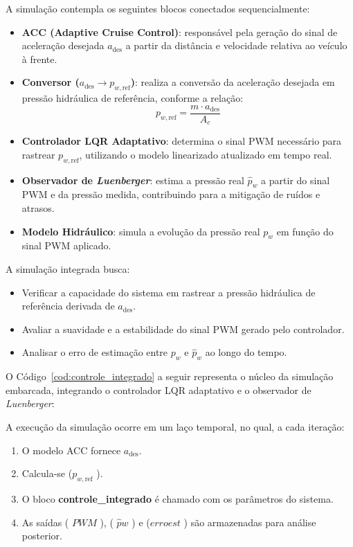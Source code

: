 A simulação contempla os seguintes blocos conectados sequencialmente:

\begin{itemize} 
    \item \textbf{ACC (Adaptive Cruise Control)}: responsável pela geração do sinal de aceleração desejada \(a_{\text{des}}\) a partir da distância e velocidade relativa ao veículo à frente. 
    \item \textbf{Conversor (\(a_{\text{des}} \rightarrow p_{w,\text{ref}}\))}: realiza a conversão da aceleração desejada em pressão hidráulica de referência, conforme a relação: 
          \[ p_{w,\text{ref}} = \frac{m \cdot a_{\text{des}}}{A_c} \] 
    \item \textbf{Controlador LQR Adaptativo}: determina o sinal PWM necessário para rastrear \(p_{w,\text{ref}}\), utilizando o modelo linearizado atualizado em tempo real. 
    \item \textbf{Observador de \textit{Luenberger}}: estima a pressão real \(\hat{p}_w\) a partir do sinal PWM e da pressão medida, contribuindo para a mitigação de ruídos e atrasos. 
    \item \textbf{Modelo Hidráulico}: simula a evolução da pressão real \(p_w\) em função do sinal PWM aplicado. 
\end{itemize}

A simulação integrada busca:

\begin{itemize} 
    \item Verificar a capacidade do sistema em rastrear a pressão hidráulica de referência derivada de \(a_{\text{des}}\). 
    \item Avaliar a suavidade e a estabilidade do sinal PWM gerado pelo controlador. 
    \item Analisar o erro de estimação entre \(p_w\) e \(\hat{p}_w\) ao longo do tempo. 
\end{itemize}

O Código~\ref{cod:controle_integrado} a seguir representa o núcleo da simulação embarcada, integrando o controlador LQR adaptativo e o observador de \textit{Luenberger}:



A execução da simulação ocorre em um laço temporal, no qual, a cada iteração:

\begin{enumerate} 
\item O modelo ACC fornece \(a_{\text{des}}\). 
\item Calcula-se ($ p_{w,\text{ref}}$ ). 
\item O bloco \textbf{controle\_integrado} é chamado com os parâmetros do sistema. 
\item As saídas ( $PWM$ ), ( $\hat{p}w$ ) e ($ erro{est}$ ) são armazenadas para análise posterior. 
\end{enumerate}

